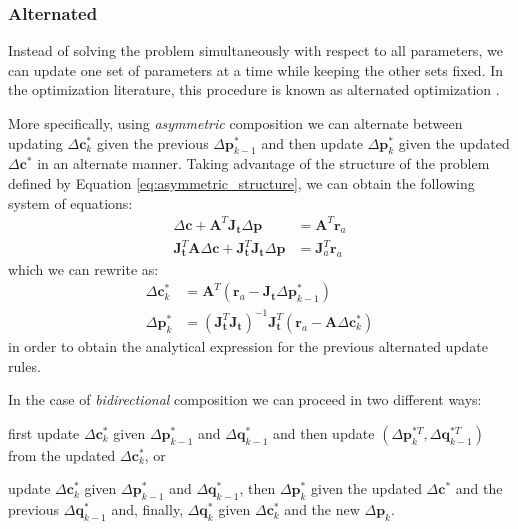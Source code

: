 \subsubsection*{Alternated}
\label{sec:gauss_newton_alternated}

Instead of solving the problem simultaneously with respect to all parameters, we can update one set of parameters at a time while keeping the other sets fixed. In the optimization literature, this procedure is known as alternated optimization \cite{DelaTorre2012}.

More specifically, using \emph{asymmetric} composition we can alternate between updating $\Delta\mathbf{c}^*_k$ given the previous $\Delta\mathbf{p}_{k-1}^*$ and then update $\Delta\mathbf{p}^*_k$ given the updated $\Delta\mathbf{c}^*$ in an alternate manner. Taking advantage of the structure of the problem defined by Equation \ref{eq:asymmetric_structure}, we can obtain the following system of equations:
\begin{equation}
    \begin{aligned}
        \Delta\mathbf{c} + \mathbf{A}^T \mathbf{J}_{\mathbf{t}} \Delta\mathbf{p} & = \mathbf{A}^T \mathbf{r}_a 
        \\
        \mathbf{J}_{\mathbf{t}}^T \mathbf{A} \Delta\mathbf{c} + \mathbf{J}_{\mathbf{t}}^T \mathbf{J}_{\mathbf{t}} \Delta\mathbf{p} & = \mathbf{J}_a^T \mathbf{r}_a 
    \label{eq:asymmetric_alt_system}
    \end{aligned}
\end{equation}
which we can rewrite as:
\begin{equation}
    \begin{aligned}
        \Delta\mathbf{c}^*_k & = \mathbf{A}^T \left( \mathbf{r}_a - \mathbf{J}_{\mathbf{t}} \Delta\mathbf{p}^*_{k-1} \right) 
        \\
        \Delta\mathbf{p}^*_k & = \left(\mathbf{J}_{\mathbf{t}}^T\mathbf{J}_{\mathbf{t}}\right)^{-1} \mathbf{J}_{\mathbf{t}}^T \left( \mathbf{r}_a - \mathbf{A} \Delta\mathbf{c}^*_{k} \right)
        \label{eq:asymmetric_alt_solution}
    \end{aligned}
\end{equation}
in order to obtain the analytical expression for the previous alternated update rules.

In the case of \emph{bidirectional} composition we can proceed in two different ways:  
\begin{inparaenum}
\item first update $\Delta\mathbf{c}^*_k$ given $\Delta\mathbf{p}_{k-1}^*$ and $\Delta\mathbf{q}_{k-1}^*$ and then update $(\Delta\mathbf{p}_{k}^{*T}, \Delta\mathbf{q}_{k-1}^{*T})$ from the updated $\Delta\mathbf{c}^*_k$, or
\item update $\Delta\mathbf{c}^*_k$ given $\Delta\mathbf{p}_{k-1}^*$ and $\Delta\mathbf{q}_{k-1}^*$, then  $\Delta\mathbf{p}^*_k$ given the updated $\Delta\mathbf{c}^*$ and the previous $\Delta\mathbf{q}^*_{k-1}$ and, finally, $\Delta\mathbf{q}^*_k$ given $\Delta\mathbf{c}_{k}^*$ and the new $\Delta\mathbf{p}_{k}$.
\end{inparaenum}  

